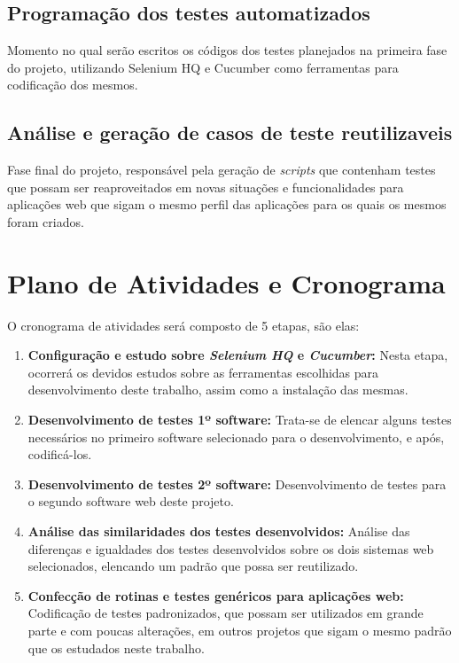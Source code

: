 \documentclass[12pt]{article}
\begin{document}
	\subsection{Programação dos testes automatizados}
	Momento no qual serão escritos os códigos dos testes planejados na primeira fase do projeto, utilizando Selenium HQ e Cucumber como ferramentas para codificação dos mesmos.

    \subsection{Análise e geração de casos de teste reutilizaveis}
    Fase final do projeto, responsável pela geração de \emph{scripts} que contenham testes que possam ser reaproveitados em novas situações e funcionalidades para aplicações web que sigam o mesmo perfil das
    aplicações para os quais os mesmos foram criados.

	\section{Plano de Atividades e Cronograma}

	O cronograma de atividades será composto de 5 etapas, são elas:
	
	\begin{enumerate}
		\item \label{activity:configuracao} \textbf{Configuração e estudo sobre \emph{Selenium HQ} e \emph{Cucumber}:}
		Nesta etapa, ocorrerá os devidos estudos sobre as ferramentas escolhidas para
		desenvolvimento deste trabalho, assim como a instalação das mesmas.
		\item \label{activity:desenvolvimento_1} \textbf{Desenvolvimento de testes 1º software:}
		Trata-se de elencar alguns testes necessários no primeiro software selecionado para o desenvolvimento,
		e após, codificá-los.
		\item \label{activity:desenvolvimento_2} \textbf{Desenvolvimento de testes 2º software:}
		Desenvolvimento de testes para o segundo software web deste projeto.
		\item \label{activity:analise} \textbf{Análise das similaridades dos testes desenvolvidos:}
		Análise das diferenças e igualdades dos testes desenvolvidos sobre os dois sistemas web selecionados,
		elencando um padrão que possa ser reutilizado.
		\item \label{activity:final} \textbf{Confecção de rotinas e testes genéricos para aplicações web:}
		Codificação de testes padronizados, que possam ser utilizados em grande parte e com poucas alterações,
		em outros projetos que sigam o mesmo padrão que os estudados neste trabalho.
	\end{enumerate}
\end{document}
